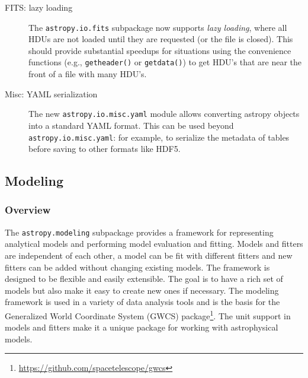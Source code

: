 \documentclass[modern]{aastex61}
\newcommand{\package}[1]{\texttt{#1}\xspace}
\newcommand{\inlinecomment}[2]{\todo[inline]{#1: #2}\xspace}
\begin{document}
\begin{description}
	\item [FITS: lazy loading ]

		The \package{astropy.io.fits} subpackage now supports \emph{lazy
		loading}, where all HDUs are not loaded until they are requested (or
		the file is closed). This should provide substantial speedups for
		situations using the convenience functions (e.g., \texttt{getheader()}
		or \texttt{getdata()}) to get HDU’s that are near the front of a file
		with many HDU’s.

	\item [Misc: YAML serialization ]

		The new \package{astropy.io.misc.yaml} module allows converting
		astropy objects into a standard YAML format.
        This can be used beyond \texttt{astropy.io.misc.yaml}: for example, to
        serialize the metadata of tables before saving to other formats like
        HDF5.

\end{description}


\subsection{Modeling}
\label{sec:modeling}
\subsubsection{Overview}
The \package{astropy.modeling} subpackage provides a framework for representing
analytical models and performing model evaluation and fitting. Models and
fitters are independent of each other, a model can be fit with different
fitters and new fitters can be added without changing existing models. The
framework is designed to be flexible and easily extensible. The goal is to have
a rich set of models but also make it easy to create new ones if necessary. The
modeling framework is used in a variety of data analysis tools and is the basis
for the Generalized World Coordinate System (GWCS)
package\footnote{\url{https://github.com/spacetelescope/gwcs}}. The
unit support in models and fitters make it a unique package for working with
astrophysical models.
\end{document}
